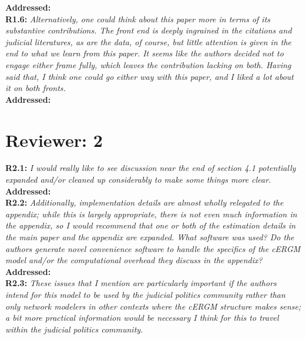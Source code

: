 \documentclass[a4paper,11pt]{texMemo}
\begin{document}
\noindent \textbf{Addressed:}   \\

\noindent \textbf{R1.6:} \emph{ Alternatively, one could think about this paper more in terms of its substantive contributions. The front end is deeply ingrained in the citations and judicial literatures, as are the data, of course, but little attention is given in the end to what we learn from this paper. It seems like the authors decided not to engage either frame fully, which leaves the contribution lacking on both. Having said that, I think one could go either way with this paper, and I liked a lot about it on both fronts. }\\

\noindent \textbf{Addressed:}   \\

\section*{Reviewer: 2}


\noindent \textbf{R2.1:} \emph{ I would really like to see discussion near the end of section 4.1 potentially expanded and/or cleaned up considerably to make some things more clear.}\\

\noindent \textbf{Addressed:}  \\

\noindent \textbf{R2.2:} \emph{ Additionally, implementation details are almost wholly relegated to the appendix; while this is largely appropriate, there is not even much information in the appendix, so I would recommend that one or both of the estimation details in the main paper and the appendix are expanded. What software was used? Do the authors generate novel convenience software to handle the specifics of the cERGM model and/or the computational overhead they discuss in the appendix?}\\

\noindent \textbf{Addressed:}  \\

\noindent \textbf{R2.3:} \emph{ These issues that I mention are particularly important if the authors intend for this model to be used by the judicial politics community rather than only network modelers in other contexts where the cERGM structure makes sense; a bit more practical information would be necessary I think for this to travel within the judicial politics community.}\\
\end{document}
